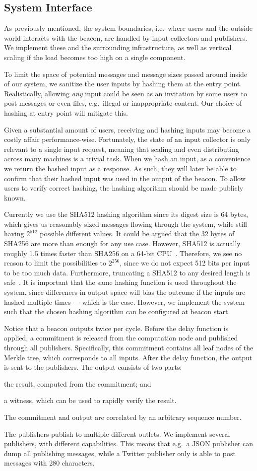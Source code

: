 \subsection{System Interface}%
\label{sub:system_interface}
As previously mentioned, the system boundaries, i.e.\ where users and the outside world interacts with the beacon, are handled by input collectors and publishers.
We implement these and the surrounding infrastructure, as well as vertical scaling if the load becomes too high on a single component.

To limit the space of potential messages and message sizes passed around inside of our system, we sanitize the user inputs by hashing them at the entry point.
Realistically, allowing \emph{any} input could be seen as an invitation by some users to post messages or even files, e.g.\ illegal or inappropriate content.
Our choice of hashing at entry point will mitigate this.

Given a substantial amount of users, receiving and hashing inputs may become a costly affair performance-wise.
Fortunately, the state of an input collector is only relevant to a single input request, meaning that scaling and even distributing across many machines is a trivial task.
When we hash an input, as a convenience we return the hashed input as a response.
As such, they will later be able to confirm that their hashed input was used in the output of the beacon.
To allow users to verify correct hashing, the hashing algorithm should be made publicly known.

Currently we use the SHA512 hashing algorithm since its digest size is 64 bytes, which gives us reasonably sized messages flowing through the system, while still having $2^{512}$ possible different values.
It could be argued that the 32 bytes of SHA256 are more than enough for any use case.
However, SHA512 is actually roughly 1.5 times faster than SHA256 on a 64-bit CPU~\cite{sha512faster}.
Therefore, we see no reason to limit the possibilities to $2^{256}$, since we do not expect 512 bits per input to be too much data.
Furthermore, truncating a SHA512 to any desired length is safe~\cite{sha512faster}.
It is important that the same hashing function is used throughout the system, since differences in output space will bias the outcome if the inputs are hashed multiple times --- which is the case.
However, we implement the system such that the chosen hashing algorithm can be configured at beacon start.

Notice that a beacon outputs twice per cycle.
Before the delay function is applied, a commitment is released from the computation node and published through all publishers.
Specifically, this commitment contains all leaf nodes of the Merkle tree, which corresponds to all inputs.
After the delay function, the output is sent to the publishers.
The output consists of two parts:
\begin{eletterate*}
    \item the result, computed from the commitment; and
    \item a witness, which can be used to rapidly verify the result.
\end{eletterate*}
The commitment and output are correlated by an arbitrary sequence number.

The publishers publish to multiple different outlets.
We implement several publishers, with different capabilities.
This means that e.g.\ a JSON publisher can dump all publishing messages, while a Twitter publisher only is able to post messages with 280 characters.

